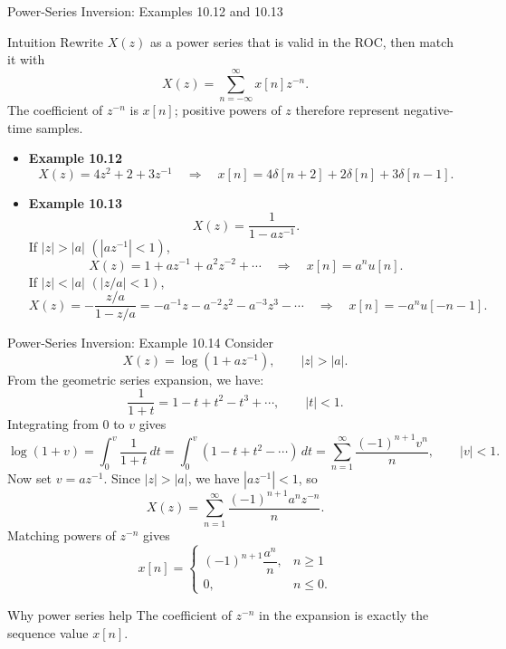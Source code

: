 \begin{frame}[t]{Power-Series Inversion: Examples 10.12 and 10.13}
  \scriptsize
  \begin{insightbox}{Intuition}
    Rewrite $X(z)$ as a power series that is valid in the ROC, then match it with
    \[
      X(z)=\sum_{n=-\infty}^{\infty}x[n]z^{-n}.
    \]
    The coefficient of $z^{-n}$ is $x[n]$; positive powers of $z$ therefore represent negative-time samples.
  \end{insightbox}

  \vspace{-0.12cm}
  \begin{itemize}
      \setlength{\itemsep}{0.08em}
    \item \textbf{Example 10.12}
      \[
        X(z)=4z^2+2+3z^{-1}
        \quad\Longrightarrow\quad
        x[n]=4\delta[n+2]+2\delta[n]+3\delta[n-1].
      \]

    \item \textbf{Example 10.13}
      \[
        X(z)=\frac{1}{1-az^{-1}}.
      \]
      If $|z|>|a|$ $(|az^{-1}|<1)$,
      \[
        X(z)=1+az^{-1}+a^2z^{-2}+\cdots
        \quad\Longrightarrow\quad
        x[n]=a^n u[n].
      \]
      If $|z|<|a|$ $(|z/a|<1)$,
      \[
        X(z)=-\frac{z/a}{1-z/a}
        =-a^{-1}z-a^{-2}z^2-a^{-3}z^3-\cdots
        \quad\Longrightarrow\quad
        x[n]=-a^n u[-n-1].
      \]

  \end{itemize}
\end{frame}

\begin{frame}[t]{Power-Series Inversion: Example 10.14}
  \small
  Consider
  \[
    X(z)=\log(1+az^{-1}), \qquad |z|>|a|.
  \]
  From the geometric series expansion, we have:
  \[
    \frac{1}{1+t}=1-t+t^2-t^3+\cdots, \qquad |t|<1.
  \]
  Integrating from $0$ to $v$ gives
  \[
    \log(1+v)=\int_0^v \frac{1}{1+t}\,dt
    =\int_0^v (1-t+t^2-\cdots)\,dt
    =\sum_{n=1}^{\infty}\frac{(-1)^{n+1}v^n}{n},
    \qquad |v|<1.
  \]
  Now set $v=az^{-1}$. Since $|z|>|a|$, we have $|az^{-1}|<1$, so
  \[
    X(z)=\sum_{n=1}^{\infty}\frac{(-1)^{n+1}a^n z^{-n}}{n}.
  \]
  Matching powers of $z^{-n}$ gives
  \[
    x[n]=
    \begin{cases}
      (-1)^{n+1}\dfrac{a^n}{n}, & n\ge 1 \\
      0, & n\le 0.
    \end{cases}
  \]
  \begin{insightbox}{Why power series help}
    The coefficient of $z^{-n}$ in the expansion is exactly the sequence value $x[n]$.
  \end{insightbox}
\end{frame}

